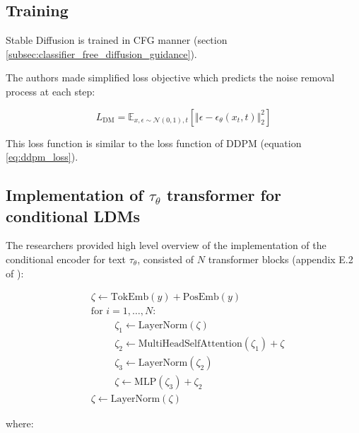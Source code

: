 \subsection{Training}

Stable Diffusion is trained in CFG manner (section \ref{subsec:classifier_free_diffusion_guidance}).

The authors made simplified loss objective which predicts the noise removal process at each step:

\[
    L_{\text{DM}} = \mathbb{E}_{x, \epsilon \sim \mathcal{N} (0, 1), t} \left[ \Vert \epsilon - \epsilon_\theta(x_t, t) \Vert _2^2 \right]
\]

This loss function is similar to the loss function of DDPM (equation \ref{eq:ddpm_loss}).













\subsection{Implementation of $\tau_\theta$ transformer for conditional LDMs}

The researchers provided high level overview of the implementation of the conditional encoder for text $\tau_\theta$, consisted of $N$ transformer blocks (appendix E.2 of \cite{stable_diffusion}):

\begin{align*}
    &\zeta \leftarrow \text{TokEmb}(y) + \text{PosEmb}(y) \\
    &\text{for } i = 1, \ldots, N : \\
        &\hspace{1cm} \zeta_1 \leftarrow \text{LayerNorm}(\zeta) \\
        &\hspace{1cm} \zeta_2 \leftarrow \text{MultiHeadSelfAttention}(\zeta_1) + \zeta \\
        &\hspace{1cm} \zeta_3 \leftarrow \text{LayerNorm}(\zeta_2) \\
        &\hspace{1cm} \zeta \leftarrow \text{MLP}(\zeta_3) + \zeta_2 \\
    &\zeta \leftarrow \text{LayerNorm}(\zeta)
\end{align*}

where:


